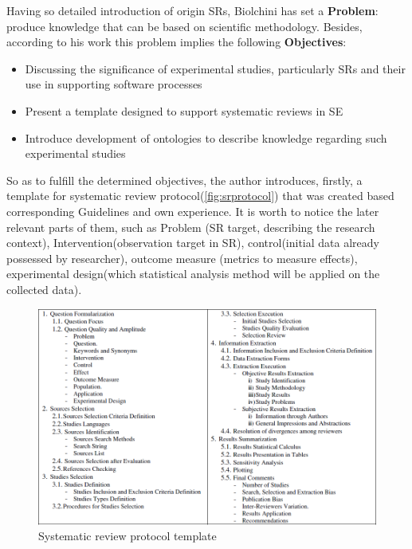 	Having so detailed introduction of origin SRs, Biolchini has set a \textbf{Problem}: produce knowledge that can be based on scientific methodology. Besides, according to his work this problem implies the following \textbf{Objectives}:
		\begin{itemize}
			\item Discussing the significance of experimental studies, particularly SRs and their use in supporting software processes
			\item Present a template designed to support systematic reviews in SE
			\item Introduce development of ontologies to describe knowledge regarding such experimental studies
		\end{itemize}
	\label{sec:OntSRinSE:guidelines}    
	So as to fulfill the determined objectives, the author introduces, firstly, a template for systematic review protocol(\autoref{fig:srprotocol}) that was created based corresponding Guidelines\cite{Kit07} and own experience. It is worth to notice the later relevant parts of them, such as Problem (SR target, describing the research context), Intervention(observation target in SR), control(initial data already possessed by researcher), outcome measure (metrics to measure effects), experimental design(which statistical analysis method will be applied on the collected data).
	\begin{figure}
		\centering
		\includegraphics[width=15cm]{images/SRreviewprotocol.PNG}
		\caption{Systematic review protocol template\cite[p. 142]{Bio07}}
		\label{fig:srprotocol}
	\end{figure}
	 \newline
	
